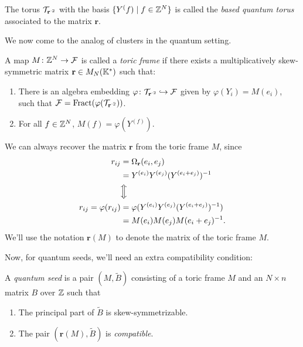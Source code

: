 \documentclass{article}
\newcommand{\tB}{\tilde{B}}
\DeclareMathOperator{\Fract}{Fract}
\begin{document}
The torus $\mathcal{T}_{\mathbf{r}^{\cdot 2}}$ with the basis $\{Y^(f) \mid f \in \mathbb{Z}^N\}$
is called the \emph{based quantum torus} associated to the matrix $\mathbf{r}$.

We now come to the analog of clusters in the quantum setting.
\begin{definition}
    A map $M \colon \mathbb{Z}^N \to \mathcal{F}$ is called a \emph{toric frame} if there exists
    a multiplicatively skew-symmetric matrix $\mathbf{r} \in M_N(\mathbb{K}^*)$ such that:
    \begin{enumerate}
        \item There is an algebra embedding
              $\varphi \colon \mathcal{T}_{\mathbf{r}^{\cdot 2}} \hookrightarrow \mathcal{F}$
              given by $\varphi(Y_i) = M(e_i)$, such that
              $\mcF = \Fract(\varphi(\mcT_{\mathbf{r}^{\cdot 2}}))$.
        \item For all $f \in \mathbb{Z}^N$, $M(f) = \varphi(Y^{(f)})$.
    \end{enumerate}
\end{definition}
\begin{remark}
    We can always recover the matrix $\mathbf{r}$ from the toric frame $M$,
    since
    \begin{align*}
        r_{ij}
                                 & = \Omega_{\mathbf{r}}(e_i, e_j)                    \\
                                 & = Y^{(e_i)}Y^{(e_j)}(Y^{(e_i + e_j)})^{-1}          \\
                                 & \Big\Updownarrow                                   \\
        r_{ij} = \varphi(r_{ij}) & = \varphi(Y^{(e_i)}Y^{(e_j)}(Y^{(e_i + e_j)})^{-1}) \\
                                 & = M(e_i)M(e_j)M(e_i + e_j)^{-1}.
    \end{align*}
    We'll use the notation $\mathbf{r}(M)$ to denote the matrix of the toric frame $M$.
\end{remark}
Now, for quantum seeds, we'll need an extra compatibility condition:
\begin{definition}
    A \emph{quantum seed} is a pair $(M, \tB)$ consisting of a toric frame $M$
    and an $N \times n$ matrix $B$ over $\mathbb{Z}$ such that
    \begin{enumerate}
        \item The principal part of $\tB$ is skew-symmetrizable.
        \item The pair $(\mathbf{r}(M), \tB)$ is \emph{compatible}.
    \end{enumerate}
\end{definition}
\end{document}
